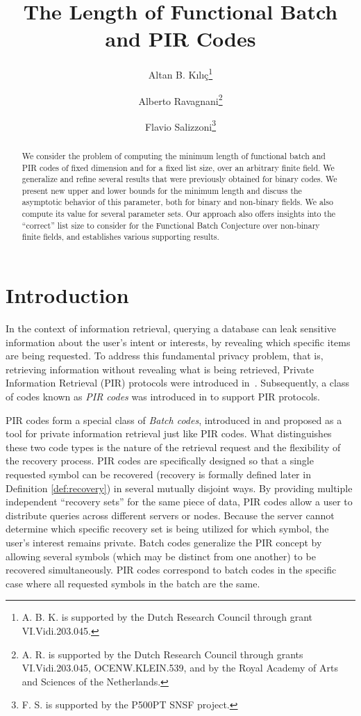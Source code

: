 \documentclass[11pt,a4paper]{article}
\title{The Length of Functional Batch and PIR Codes}
\author[1]{Altan B. K\i l\i\c{c}\thanks{A. B. K. is supported by the Dutch Research Council through grant VI.Vidi.203.045.}}
\author[2]{Alberto Ravagnani\thanks{A. R. is supported by the Dutch Research Council through grants VI.Vidi.203.045, 
OCENW.KLEIN.539, 
and by the Royal Academy of Arts and Sciences of the Netherlands.}}
\author[3]{Flavio Salizzoni\thanks{F. S. is supported by the P500PT\textunderscore  222344 SNSF project.}}
\affil[1,2]{
Eindhoven University of Technology, the Netherlands}
\affil[3]{Max Planck Institute for Mathematics in the Sciences, Germany}
\date{}
\theoremstyle{definition}
\begin{document}
\maketitle

\begin{abstract}
We consider the problem of computing the minimum length of functional batch and PIR codes of fixed dimension and for a fixed list size, over an arbitrary finite field. We generalize and refine several results that were previously obtained for binary codes. We present new upper and lower bounds for the minimum length and discuss the asymptotic behavior of this parameter, both for binary and non-binary fields.
We also compute its value for several parameter sets. Our approach also offers insights into the ``correct'' list size to consider for the Functional Batch Conjecture over non-binary finite fields, and establishes various supporting results.
\end{abstract}

\bigskip

\section{Introduction}


In the context of information retrieval,  querying a database can 
leak sensitive information
about the user's intent or interests, by revealing which specific items are being requested.
To address this fundamental privacy problem, that is, retrieving information without revealing what is being retrieved, Private Information Retrieval (PIR) protocols were introduced in~\cite{chor1998private}. Subsequently, a class of codes known as \textit{PIR codes} was introduced in \cite{fazeli2015pir} to support PIR protocols.

PIR codes form a special class of \textit{Batch codes}, introduced in \cite{ishai2004batch} and proposed as a tool for private information retrieval just like PIR codes. 
What distinguishes these two code types is the nature of the retrieval request and the flexibility of the recovery process.
PIR codes are specifically designed so that a single requested symbol can be recovered (recovery is formally defined later in Definition \ref{def:recovery}) in several mutually disjoint ways. By providing multiple independent ``recovery sets'' for the same piece of data, PIR codes allow a user to distribute queries across different servers or nodes. Because the server cannot determine which specific recovery set is being utilized for which symbol, the user's interest remains private. Batch codes
generalize the PIR concept by allowing several symbols (which may be distinct from one another) to be recovered simultaneously. PIR codes correspond to batch codes in the specific case where all requested symbols in the batch are the same. 
\end{document}
